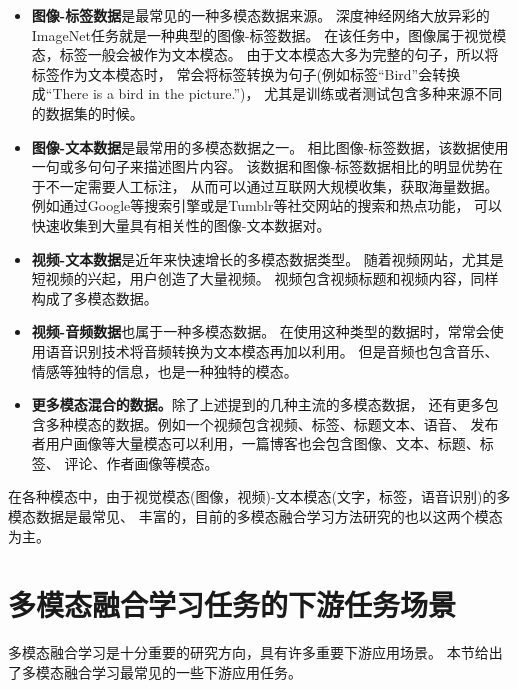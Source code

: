 \begin{itemize}
    \item \textbf{图像-标签数据}是最常见的一种多模态数据来源。
    深度神经网络大放异彩的ImageNet任务就是一种典型的图像-标签数据。
    在该任务中，图像属于视觉模态，标签一般会被作为文本模态。
    由于文本模态大多为完整的句子，所以将标签作为文本模态时，
    常会将标签转换为句子(例如标签``Bird''会转换成``There is a bird in the picture.'')，
    尤其是训练或者测试包含多种来源不同的数据集的时候。
    \item \textbf{图像-文本数据}是最常用的多模态数据之一。
    相比图像-标签数据，该数据使用一句或多句句子来描述图片内容。
    该数据和图像-标签数据相比的明显优势在于不一定需要人工标注，
    从而可以通过互联网大规模收集，获取海量数据。例如通过Google等搜索引擎或是Tumblr等社交网站的搜索和热点功能，
    可以快速收集到大量具有相关性的图像-文本数据对。
    \item \textbf{视频-文本数据}是近年来快速增长的多模态数据类型。
    随着视频网站，尤其是短视频的兴起，用户创造了大量视频。
    视频包含视频标题和视频内容，同样构成了多模态数据。
    \item \textbf{视频-音频数据}也属于一种多模态数据。
    在使用这种类型的数据时，常常会使用语音识别技术将音频转换为文本模态再加以利用。
    但是音频也包含音乐、情感等独特的信息，也是一种独特的模态。
    \item \textbf{更多模态混合的数据。}除了上述提到的几种主流的多模态数据，
    还有更多包含多种模态的数据。例如一个视频包含视频、标签、标题文本、语音、
    发布者用户画像等大量模态可以利用，一篇博客也会包含图像、文本、标题、标签、
    评论、作者画像等模态。
\end{itemize}

在各种模态中，由于视觉模态(图像，视频)-文本模态(文字，标签，语音识别)的多模态数据是最常见、
丰富的，目前的多模态融合学习方法研究的也以这两个模态为主。

\section{多模态融合学习任务的下游任务场景}

多模态融合学习是十分重要的研究方向，具有许多重要下游应用场景。
本节给出了多模态融合学习最常见的一些下游应用任务。

